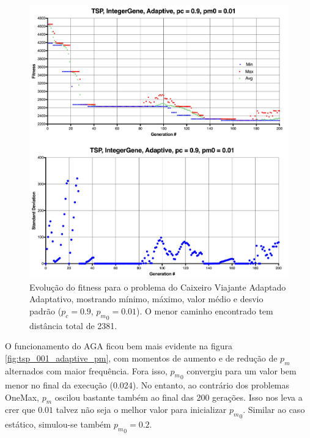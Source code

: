 \begin{figure}[ht!]
    \centering \includegraphics[width=1.0\textwidth]{tsp_001_adaptive.jpg}
    \caption{Evolução do fitness para o problema do Caixeiro Viajante Adaptado Adaptativo, mostrando mínimo, máximo, valor médio e desvio padrão ($p_c=0.9$, ${p_m}_0=0.01$). O menor caminho encontrado tem distância total de 2381.}
    \label{fig:tsp_001_adaptative}
\end{figure}

O funcionamento do AGA ficou bem mais evidente na figura \ref{fig:tsp_001_adaptive_pm}, com momentos de aumento e de redução de $p_m$ alternados com maior frequência. Fora isso, ${p_m}_0$ convergiu para um valor bem menor no final da execução (0.024). No entanto, ao contrário dos problemas OneMax, $p_m$ oscilou bastante também ao final das 200 gerações. Isso nos leva a crer que $0.01$ talvez não seja o melhor valor para inicializar ${p_m}_0$. Similar ao caso estático, simulou-se também ${p_m}_0 = 0.2$.

